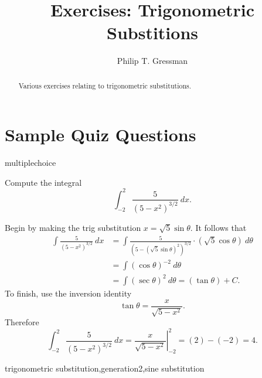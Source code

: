 \documentclass{ximera}
\title{Exercises: Trigonometric Substitions}
\author{Philip T. Gressman}
\begin{document}
\begin{abstract}
Various exercises relating to trigonometric substitutions.
\end{abstract}
\maketitle


\section*{Sample Quiz Questions}
\begin{question}[TrigSub001]
\begin{type}
multiplechoice
\end{type}
Compute the integral 
\[\int_{-2}^{2}\frac{5}{(5-x^2)^{3/2}}~dx.\]
\begin{multiplechoice}
\end{multiplechoice}
\begin{feedback}
Begin by making the trig substitution \(x=\sqrt{5}\sin \theta\). It follows that 
\[ \begin{aligned} \int\frac{5}{(5-x^2)^{3/2}}~dx & = \int \frac{5}{(5-(\sqrt{5}\sin \theta)^2)^{3/2}} \cdot (\sqrt{5}\cos \theta)~d \theta \\
 & = \int (\cos \theta)^{-2}~d \theta \\ & = \int (\sec \theta)^{2} ~ d \theta = (\tan \theta) + C. \end{aligned} \]
To finish, use the inversion identity \[\tan \theta = \frac{x}{\sqrt{5-x^2}}.\]
Therefore \[\int_{-2}^{2}\frac{5}{(5-x^2)^{3/2}}~dx = \left.\frac{x}{\sqrt{5-x^2}}\right|_{-2}^{2} = \left(2\right) - \left(-2\right) = 4.\]
\end{feedback}
\begin{keywords}
trigonometric substitution,generation2,sine substitution
\end{keywords}
\end{question}
\end{document}
